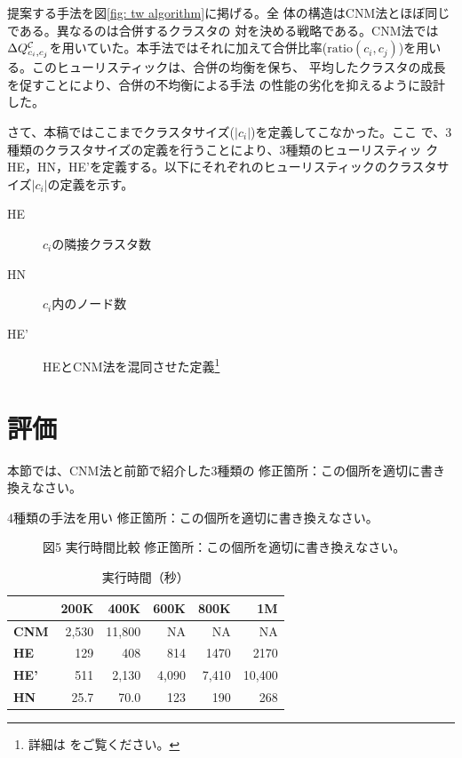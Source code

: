 \documentclass [a4j,11pt] {jsarticle}
\begin{document}
提案する手法を図\ref {fig: tw algorithm}に掲げる。全
体の構造はCNM法とほぼ同じである。異なるのは合併するクラスタの
対を決める戦略である。CNM法では$\Delta Q^{{\cal C}}_{c_i,c_j}$を用いていた。本手法ではそれに加えて合併比率($\mathrm
{ratio}(c_i, c_j)$)を用いる。このヒューリスティックは、合併の均衡を保ち、
平均したクラスタの成長を促すことにより、合併の不均衡による手法
の性能の劣化を抑えるように設計した。

さて、本稿ではここまでクラスタサイズ($|c_i|$)を定義してこなかった。ここ
で、3種類のクラスタサイズの定義を行うことにより、3種類のヒューリスティッ
クHE，HN，HE'を定義する。以下にそれぞれのヒューリスティックのクラスタサ
イズ$|c_i|$の定義を示す。

\begin{description}
	\item[HE]  $c_i$の隣接クラスタ数
	\item[HN]  $c_i$内のノード数
	\item[HE']  HEとCNM法を混同させた定義\footnote{詳細は \cite{Wakita07}をご覧ください。}
\end{description}


\section {評価}
\label {sect: evaluation}

\begin {空欄ブロック}{本節では、CNM法と前節で紹介した3種類の}
修正箇所：この個所を適切に書き換えなさい。
\end {空欄ブロック}

\begin {空欄ブロック}{4種類の手法を用い}
修正箇所：この個所を適切に書き換えなさい。
\end {空欄ブロック}

\begin{figure}[htbp]
\begin {空欄ブロック}{図5 実行時間比較}
修正箇所：この個所を適切に書き換えなさい。
\end {空欄ブロック}
\end{figure}

\begin {table}
  \caption {実行時間（秒）}
  \label {tbl: elapsed time}
  \begin {center}
    \begin {tabular}{lrrrrr} \\ \hline
          & 200K & 400K & 600K & 800K & 1M \\ \hline
      \textbf {CNM}& 2,530 & 11,800 & NA & NA & NA \\
      \textbf {HE}  & 129  & 408  & 814  & 1470 & 2170 \\
      \textbf {HE'} & 511  & 2,130 & 4,090 & 7,410 & 10,400 \\
      \textbf {HN}  & 25.7 & 70.0 & 123  & 190  & 268 \\
      \hline
    \end {tabular}
  \end {center}
\end {table}
\end{document}
